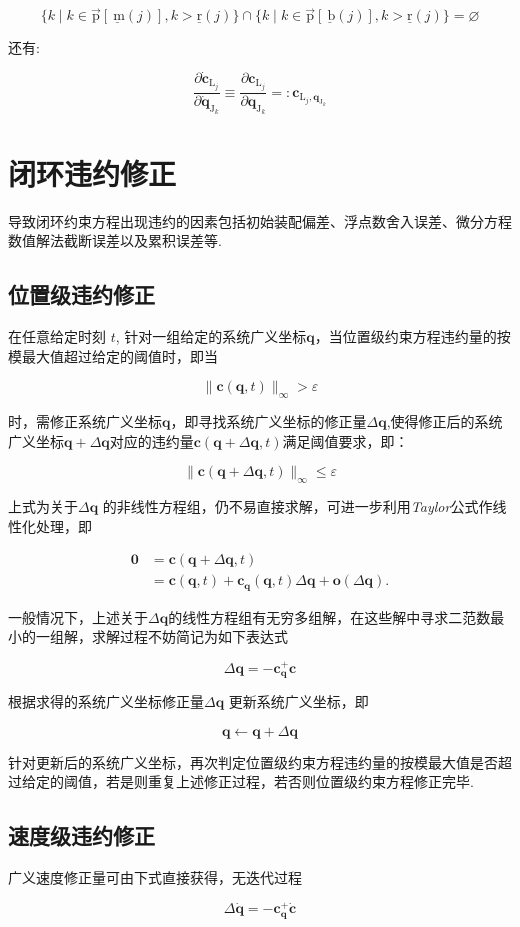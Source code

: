\[
\{k \mid k \in \overrightarrow{\mathrm{p}}[\underline{\mathrm{~m}}(j)], k>\underline{\mathrm{r}}(j)\} \cap\{k \mid k \in \overrightarrow{\mathrm{p}}[\underline{\mathrm{~b}}(j)], k>\underline{\mathrm{r}}(j)\}=\varnothing
\]

还有:

\[
\frac{\partial \dot{\boldsymbol{c}}_{\mathrm{L}_{j}}}{\partial \dot{\boldsymbol{q}}_{\mathrm{J}_{k}}} \equiv \frac{\partial \boldsymbol{c}_{\mathrm{L}_{j}}}{\partial \boldsymbol{q}_{\mathrm{J}_{k}}}=: \boldsymbol{c}_{\mathrm{L}_{j}, \boldsymbol{q}_{\mathrm{J}_{k}}}
\]
\section{闭环违约修正}
导致闭环约束方程出现违约的因素包括初始装配偏差、浮点数舍入误差、微分方程数值解法截断误差以及累积误差等.
\subsection{位置级违约修正}
在任意给定时刻 $t$, 针对一组给定的系统广义坐标$\boldsymbol{q}$，当位置级约束方程违约量的按模最大值超过给定的阈值时，即当

\[
\|\boldsymbol{c}(\boldsymbol{q}, t)\|_{\infty}>\varepsilon
\]

时，需修正系统广义坐标$\boldsymbol{q}$，即寻找系统广义坐标的修正量$\Delta \boldsymbol{q}$,使得修正后的系统广义坐标$\boldsymbol{q}+\Delta \boldsymbol{q}$对应的违约量$\boldsymbol{c}(\boldsymbol{q}+\Delta \boldsymbol{q},t)$满足阈值要求，即：

\[
\|\boldsymbol{c}(\boldsymbol{q}+\Delta \boldsymbol{q},t)\|_{\infty}\leq\varepsilon
\]

上式为关于$\Delta \boldsymbol{q}$ 的非线性方程组，仍不易直接求解，可进一步利用\emph{Taylor}公式作线性化处理，即

\[
\begin{aligned}
\mathbf{0} & =\boldsymbol{c}(\boldsymbol{q}+\Delta \boldsymbol{q}, t) \\
& =\boldsymbol{c}(\boldsymbol{q}, t)+\boldsymbol{c}_{\boldsymbol{q}}(\boldsymbol{q}, t) \Delta \boldsymbol{q}+\boldsymbol{o}(\Delta \boldsymbol{q}) .
\end{aligned}
\]

一般情况下，上述关于$\Delta \boldsymbol{q}$的线性方程组有无穷多组解，在这些解中寻求二范数最小的一组解，求解过程不妨简记为如下表达式

\[
\Delta \boldsymbol{q}=-\boldsymbol{c}_{\boldsymbol{q}}^{+} \boldsymbol{c}
\]

根据求得的系统广义坐标修正量$\Delta \boldsymbol{q}$  更新系统广义坐标，即

\[
\boldsymbol{q} \leftarrow \boldsymbol{q}+\Delta \boldsymbol{q}
\]

针对更新后的系统广义坐标，再次判定位置级约束方程违约量的按模最大值是否超过给定的阈值，若是则重复上述修正过程，若否则位置级约束方程修正完毕.
\subsection{速度级违约修正}
广义速度修正量可由下式直接获得，无迭代过程

\[
\Delta\dot{\boldsymbol{q}} =-\boldsymbol{c}_{\boldsymbol{q}}^{+} \dot{\boldsymbol{c}}
\]
